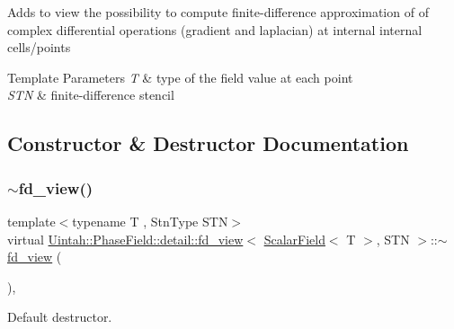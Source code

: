 Adds to view the possibility to compute finite-\/difference approximation of of complex differential operations (gradient and laplacian) at internal internal cells/points


\begin{DoxyTemplParams}{Template Parameters}
{\em T} & type of the field value at each point \\
\hline
{\em S\+TN} & finite-\/difference stencil \\
\hline
\end{DoxyTemplParams}


\subsection{Constructor \& Destructor Documentation}
\mbox{\label{classUintah_1_1PhaseField_1_1detail_1_1fd__view_3_01ScalarField_3_01T_01_4_00_01STN_01_4_ae0c8252279c942f0732dd858662f045f}} 
\subsubsection{\texorpdfstring{$\sim$fd\+\_\+view()}{~fd\_view()}}
{\footnotesize\ttfamily template$<$typename T , Stn\+Type S\+TN$>$ \\
virtual \hyperlink{classUintah_1_1PhaseField_1_1detail_1_1fd__view}{Uintah\+::\+Phase\+Field\+::detail\+::fd\+\_\+view}$<$ \hyperlink{structUintah_1_1PhaseField_1_1ScalarField}{Scalar\+Field}$<$ T $>$, S\+TN $>$\+::$\sim$\hyperlink{classUintah_1_1PhaseField_1_1detail_1_1fd__view}{fd\+\_\+view} (\begin{DoxyParamCaption}{ }\end{DoxyParamCaption})\hspace{0.3cm}{\ttfamily [virtual]}, {\ttfamily [default]}}



Default destructor. 



